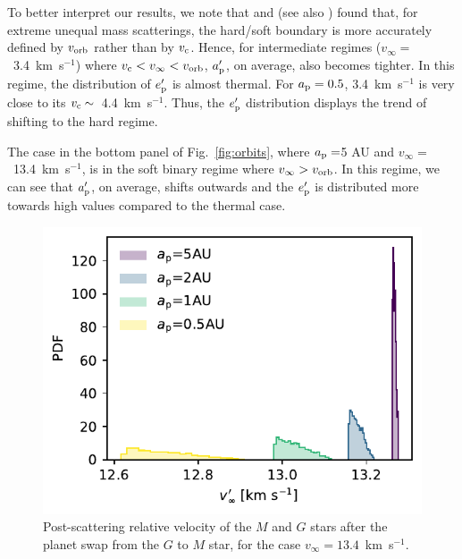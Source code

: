 \documentclass[twocolumn]{aastex62}
\begin{document}
 To better interpret our results, we note that
\citet{Hills1989} and \citet{Hills1990} (see also \citealt{Fregeau2006})
found  that, for extreme unequal mass scatterings, the hard/soft boundary is more accurately defined by $v_{\rm orb}$ rather than by $v_{\rm c}$. Hence, for intermediate regimes ($v_\infty=$~3.4~km~s$^{-1}$) where $v_{\rm c} < v_\infty < v_{\rm orb}$,  $a_{\rm p}^\prime$, on average, also becomes tighter. In this regime, the distribution of $e^\prime_{\rm p}$ is almost thermal. For $a_{\rm p}=0.5$, 3.4~km~s$^{-1}$ is very close to its $v_{\rm c}\sim$~4.4~km~s$^{-1}$. Thus, the  $e^\prime_{\rm p}$ distribution displays the trend of shifting to the hard regime. 

The case in the bottom panel of Fig.~\ref{fig:orbits}, where $a_{\rm p}=$5 AU and $v_\infty=$~13.4~km~s$^{-1}$, is in the soft binary regime where $v_\infty > v_{\rm orb}$. In this regime, we can see that $a_{\rm p}^\prime$, on average, shifts outwards and the $e_{\rm p}^\prime$ is distributed more towards high values compared to the thermal case.



\begin{figure}
  \includegraphics[width=0.9\columnwidth]{letter-v}
  \caption{Post-scattering relative velocity of the $M$ and  $G$ stars after the planet swap from the  $G$ to $M$ star, for the case 
   $v_\infty=13.4$~km~s$^{-1}$.}
 \label{fig:velocity}
\end{figure}
\end{document}
